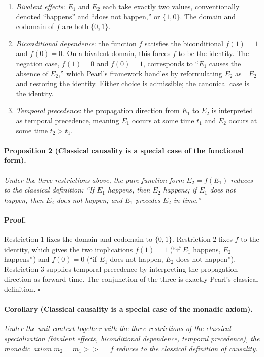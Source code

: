 \begin{enumerate}
\item \emph{Bivalent effects}: $E_1$ and $E_2$ each take exactly two values, conventionally denoted ``happens'' and ``does not happen,'' or $\{1, 0\}$. The domain and codomain of $f$ are both $\{0, 1\}$.
 
\item \emph{Biconditional dependence}: the function $f$ satisfies the biconditional $f(1) = 1$ and $f(0) = 0$. On a bivalent domain, this forces $f$ to be the identity. The negation case, $f(1) = 0$ and $f(0) = 1$, corresponds to ``$E_1$ causes the absence of $E_2$,'' which Pearl's framework handles by reformulating $E_2$ as $\neg E_2$ and restoring the identity. Either choice is admissible; the canonical case is the identity.
 
\item \emph{Temporal precedence}: the propagation direction from $E_1$ to $E_2$ is interpreted as temporal precedence, meaning $E_1$ occurs at some time $t_1$ and $E_2$ occurs at some time $t_2 > t_1$.
\end{enumerate}

\newpage

 
\paragraph{Proposition 2 (Classical causality is a special case of the functional form).}
\emph{Under the three restrictions above, the pure-function form $E_2 = f(E_1)$ reduces to the classical definition: ``If $E_1$ happens, then $E_2$ happens; if $E_1$ does not happen, then $E_2$ does not happen; and $E_1$ precedes $E_2$ in time.''}

 
\paragraph{Proof.}
Restriction 1 fixes the domain and codomain to $\{0, 1\}$. Restriction 2 fixes $f$ to the identity, which gives the two implications $f(1) = 1$ (``if $E_1$ happens, $E_2$ happens'') and $f(0) = 0$ (``if $E_1$ does not happen, $E_2$ does not happen''). Restriction 3 supplies temporal precedence by interpreting the propagation direction as forward time. The conjunction of the three is exactly Pearl's classical definition. $\square$
 
\paragraph{Corollary (Classical causality is a special case of the monadic axiom).}
\emph{Under the unit context together with the three restrictions of the classical specialization (bivalent effects, biconditional dependence, temporal precedence), the monadic axiom $m_2 = m_1 \mathbin{>\!\!>\!\!=} f$ reduces to the classical definition of causality.}
 
